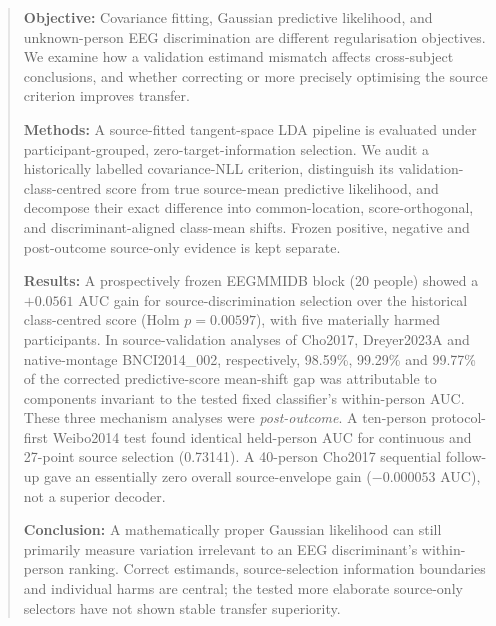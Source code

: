 \begin{abstract}
\textbf{Objective:}
Covariance fitting, Gaussian predictive likelihood, and
unknown-person EEG discrimination are different
regularisation objectives. We examine how a validation
estimand mismatch affects cross-subject conclusions,
and whether correcting or more precisely optimising
the source criterion improves transfer.

\textbf{Methods:}
A source-fitted tangent-space LDA pipeline is evaluated
under participant-grouped, zero-target-information
selection. We audit a historically labelled
covariance-NLL criterion, distinguish its
validation-class-centred score from true
source-mean predictive likelihood, and decompose
their exact difference into common-location,
score-orthogonal, and discriminant-aligned
class-mean shifts. Frozen positive, negative and
post-outcome source-only evidence is kept separate.

\textbf{Results:}
A prospectively frozen EEGMMIDB block (20 people)
showed a $+0.0561$ AUC gain for source-discrimination
selection over the historical class-centred score
(Holm $p=0.00597$), with five materially harmed
participants. In source-validation analyses of
Cho2017, Dreyer2023A and native-montage
BNCI2014\_002, respectively, 98.59\%,
99.29\% and 99.77\% of the corrected
predictive-score mean-shift gap was attributable
to components invariant to the tested fixed
classifier's within-person AUC. These
three mechanism analyses were \emph{post-outcome}.
A ten-person protocol-first Weibo2014 test found
identical held-person AUC for continuous and
27-point source selection (0.73141).
A 40-person Cho2017 sequential follow-up
gave an essentially zero overall source-envelope
gain ($-0.000053$ AUC), not a superior decoder.

\textbf{Conclusion:}
A mathematically proper Gaussian likelihood
can still primarily measure variation irrelevant
to an EEG discriminant's within-person ranking.
Correct estimands, source-selection information
boundaries and individual harms are central;
the tested more elaborate source-only selectors
have not shown stable transfer superiority.
\end{abstract}
